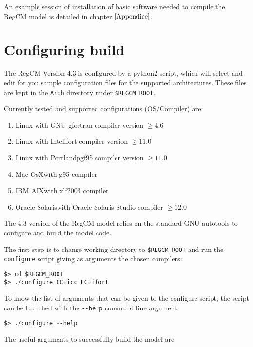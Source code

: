 An example session of installation of basic software needed to compile the
RegCM model is detailed in chapter $\ref{Appendice}$.

\section{Configuring build}

The RegCM Version 4.3 is configured by a python2 script, which will select
and edit for you sample configuration files for the supported architectures.
These files are kept in the \verb=Arch= directory under \verb=$REGCM_ROOT=.

Currently tested and supported configurations (OS/Compiler) are:

\begin{enumerate}
\item Linux with GNU gfortran compiler version $\ge 4.6$
\item Linux with Intel\texttrademark ifort compiler version $\ge 11.0$
\item Linux with Portland\texttrademark pgf95 compiler version $\ge 11.0$
\item Mac OsX\texttrademark with g95 compiler
\item IBM AIX\texttrademark with xlf2003 compiler
\item Oracle Solaris\texttrademark with Oracle Solaris Studio\texttrademark
compiler $\ge 12.0$
\end{enumerate}

The 4.3 version of the RegCM model relies on the standard GNU autotools to
configure and build the model code.

The first step is to change working directory to \verb=$REGCM_ROOT= and run the
\verb=configure= script giving as arguments the chosen compilers:

\begin{Verbatim}
$> cd $REGCM_ROOT
$> ./configure CC=icc FC=ifort
\end{Verbatim}

To know the list of arguments that can be given to the configure script, the
script can be launched with the \verb=--help= command line argument.

\begin{Verbatim}
$> ./configure --help
\end{Verbatim}

The useful arguments to successfully build the model are:

